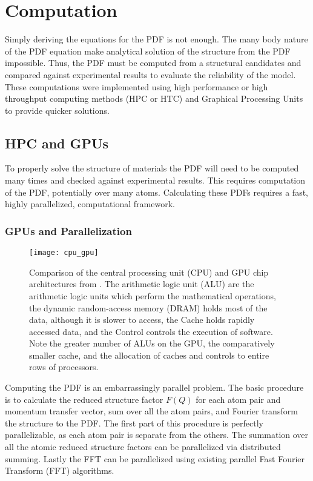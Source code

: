 \section{Computation} \label{sec:comp}
Simply deriving the equations for the PDF is not enough.
The many body nature of the PDF equation make analytical solution of the structure from the PDF impossible.
Thus, the PDF must be computed from a structural candidates and compared against experimental results to evaluate the reliability of the model.
These computations were implemented using high performance or high throughput computing methods (HPC or HTC) and Graphical Processing Units to provide quicker solutions.

\subsection{HPC and GPUs}
To properly solve the structure of materials the PDF will need to be computed many times and checked against experimental results.
This requires computation of the PDF, potentially over many atoms.
Calculating these PDFs requires a fast, highly parallelized, computational framework.
\subsubsection{GPUs and Parallelization}
\begin{figure}
    \texttt{[image: cpu\_gpu]}
    \caption[Comparison of the CPU and GPU chip architectures]{
    Comparison of the central processing unit (CPU) and GPU chip architectures from \cite{Chen2013}.
    The arithmetic logic unit (ALU) are the arithmetic logic units which perform the mathematical operations,
    the dynamic random-access memory (DRAM) holds most of the data, although it is slower to access,
    the Cache holds rapidly accessed data,
    and the Control controls the execution of software.
    Note the greater number of ALUs on the GPU, the comparatively smaller cache,
    and the allocation of caches and controls to entire rows of processors.}
    \label{fig:cpu_vs_gpu}
\end{figure}
Computing the PDF is an embarrassingly parallel problem.
The basic procedure is to calculate the reduced structure factor $F(Q)$ for each atom pair and momentum transfer vector, sum over all the atom pairs, and Fourier transform the structure to the PDF.
The first part of this procedure is perfectly parallelizable, as each atom pair is separate from the others.
The summation over all the atomic reduced structure factors can be parallelized via distributed summing.
Lastly the FFT can be parallelized using existing parallel Fast Fourier Transform (FFT) algorithms.


